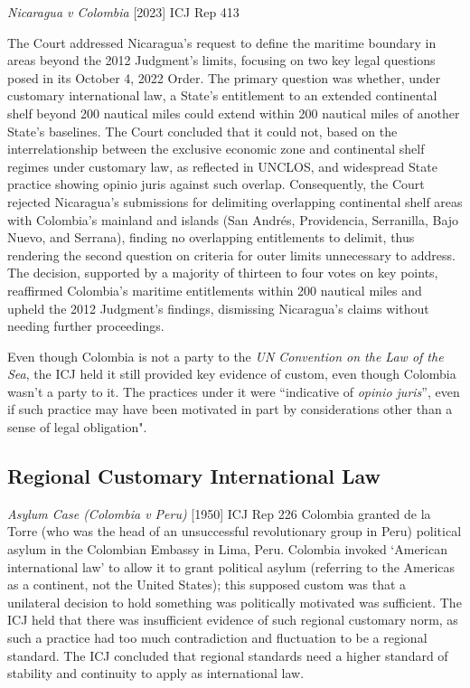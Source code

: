 \begin{casedetails}{\textit{Nicaragua v Colombia} [2023] ICJ Rep 413}\label{case:Nicaragua v Colombia}
    \flushleft

    The Court addressed Nicaragua's request to define the maritime boundary in areas beyond the 2012 Judgment's limits, focusing on two key legal questions posed in its October 4, 2022 Order. The primary question was whether, under customary international law, a State's entitlement to an extended continental shelf beyond 200 nautical miles could extend within 200 nautical miles of another State's baselines. The Court concluded that it could not, based on the interrelationship between the exclusive economic zone and continental shelf regimes under customary law, as reflected in UNCLOS, and widespread State practice showing opinio juris against such overlap. Consequently, the Court rejected Nicaragua's submissions for delimiting overlapping continental shelf areas with Colombia's mainland and islands (San Andrés, Providencia, Serranilla, Bajo Nuevo, and Serrana), finding no overlapping entitlements to delimit, thus rendering the second question on criteria for outer limits unnecessary to address. The decision, supported by a majority of thirteen to four votes on key points, reaffirmed Colombia's maritime entitlements within 200 nautical miles and upheld the 2012 Judgment's findings, dismissing Nicaragua's claims without needing further proceedings.

    \tcblower
    \flushleft

    Even though Colombia is not a party to the \textit{UN Convention on the Law of the Sea}, the ICJ held it still provided key evidence of custom, even though Colombia wasn't a party to it. The practices under it were ``indicative of \textit{opinio juris}'', even if such practice may have been motivated in part by considerations other than a sense of legal obligation".
\end{casedetails}

\subsection{Regional Customary International Law}
\begin{casedetails}{\textit{Asylum Case (Colombia v Peru)} [1950] ICJ Rep 226}\label{case:Asylum case}
    \flushleft
    Colombia granted de la Torre (who was the head of an unsuccessful revolutionary group in Peru) political asylum in the Colombian Embassy in Lima, Peru. Colombia invoked `American international law' to allow it to grant political asylum (referring to the Americas as a continent, not the United States); this supposed custom was that a unilateral decision to hold something was politically motivated was sufficient. The ICJ held that there was insufficient evidence of such regional customary norm, as such a practice had too much contradiction and fluctuation to be a regional standard. The ICJ concluded that regional standards need a higher standard of stability and continuity to apply as international law.
\end{casedetails}

